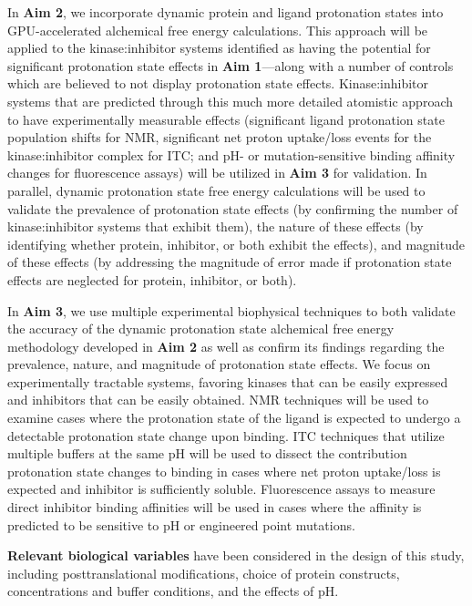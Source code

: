 \documentclass[11pt]{article}
\begin{document}
In {\bf Aim 2}, we incorporate dynamic protein and ligand protonation states into GPU-accelerated alchemical free energy calculations.
This approach will be applied to the kinase:inhibitor systems identified as having the potential for significant protonation state effects in {\bf Aim 1}---along with a number of controls which are believed to not display protonation state effects.
Kinase:inhibitor systems that are predicted through this much more detailed atomistic approach to have experimentally measurable effects (significant ligand protonation state population shifts for NMR, significant net proton uptake/loss events for the kinase:inhibitor complex for ITC; and pH- or mutation-sensitive binding affinity changes for fluorescence assays) will be utilized in {\bf Aim 3} for validation.
In parallel, dynamic protonation state free energy calculations will be used to validate the prevalence of protonation state effects (by confirming the number of kinase:inhibitor systems that exhibit them), the nature of these effects (by identifying whether protein, inhibitor, or both exhibit the effects), and magnitude of these effects (by addressing the magnitude of error made if protonation state effects are neglected for protein, inhibitor, or both).

In {\bf Aim 3}, we use multiple experimental biophysical techniques to both validate the accuracy of the dynamic protonation state alchemical free energy methodology developed in {\bf Aim 2} as well as confirm its findings regarding the prevalence, nature, and magnitude of protonation state effects.
We focus on experimentally tractable systems, favoring kinases that can be easily expressed and inhibitors that can be easily obtained.
NMR techniques will be used to examine cases where the protonation state of the ligand is expected to undergo a detectable protonation state change upon binding.
ITC techniques that utilize multiple buffers at the same pH will be used to dissect the contribution protonation state changes to binding in cases where net proton uptake/loss is expected and inhibitor is sufficiently soluble.
Fluorescence assays to measure direct inhibitor binding affinities will be used in cases where the affinity is predicted to be sensitive to pH or engineered point mutations.

{\bf Relevant biological variables} have been considered in the design of this study, including posttranslational modifications, choice of protein constructs, concentrations and buffer conditions, and the effects of pH.
\end{document}
